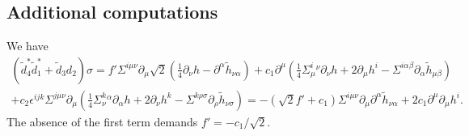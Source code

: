 \documentclass[10pt]{report}
\theoremstyle{definition}
\begin{document}
\subsection{Additional computations}

We have
\begin{align}\nonumber
(\tilde{d}_4^* \tilde{d}_1^* +\tilde{d}_3 d_2)\sigma =f' \Sigma^{i\mu\nu} \partial_\mu \sqrt{2} (\frac{1}{4} \partial_\nu h -  \partial^\alpha \tilde{h}_{\nu\alpha}) 
+ c_1 \partial^\mu ( \frac{1}{4} \Sigma^i_\mu{}^\nu \partial_\nu h +2 \partial_\mu h^i -  \Sigma^{i\alpha\beta} \partial_\alpha \tilde{h}_{\mu\beta} ) \\ \nonumber
+  c_2 \epsilon^{ijk} \Sigma^{j\mu\nu} \partial_\mu ( \frac{1}{4} \Sigma^k_\nu{}^\alpha \partial_\alpha h +2 \partial_\nu h^k -  \Sigma^{k\rho\sigma} \partial_\rho \tilde{h}_{\nu\sigma}) = 
-(\sqrt{2} f' +c_1) \Sigma^{i\mu\nu} \partial_\mu \partial^\alpha \tilde{h}_{\nu\alpha}  + 2 c_1 \partial^\mu \partial_\mu h^i. 
\end{align}
The absence of the first term demands $f'=- c_1/\sqrt{2}$.
\end{document}
